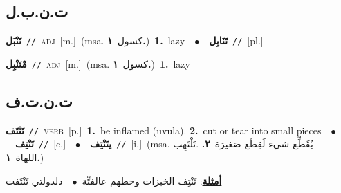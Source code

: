 \documentclass[10pt,a4paper,twoside]{article} %
\begin{document}
\begin{multicols}{2}
\vspace{-3mm}
\subsection*{\color{blue}\foreignlanguage{arabic}{ت.ن.ب.ل}\color{blue}{}} 

{\setlength\topsep{0pt}\textbf{\foreignlanguage{arabic}{تَنْبَل}}\ {\color{gray}\texttt{//}\color{black}}\ \textsc{adj}\ [m.]\ \color{gray}(msa. \foreignlanguage{arabic}{كسول}~\foreignlanguage{arabic}{\textbf{١.}})\color{black}\ \textbf{1.}~lazy\ \ $\bullet$\ \ \setlength\topsep{0pt}\textbf{\foreignlanguage{arabic}{تَنَابِل}}\ {\color{gray}\texttt{//}\color{black}}\ [pl.]\ } \vspace{2mm}

{\setlength\topsep{0pt}\textbf{\foreignlanguage{arabic}{مْتَنْبِل}}\ {\color{gray}\texttt{//}\color{black}}\ \textsc{adj}\ [m.]\ \color{gray}(msa. \foreignlanguage{arabic}{كسول}~\foreignlanguage{arabic}{\textbf{١.}})\color{black}\ \textbf{1.}~lazy\ } \vspace{2mm}

\vspace{-3mm}
\subsection*{\color{blue}\foreignlanguage{arabic}{ت.ن.ت.ف}\color{blue}{}} 

{\setlength\topsep{0pt}\textbf{\foreignlanguage{arabic}{تَنْتَف}}\ {\color{gray}\texttt{//}\color{black}}\ \textsc{verb}\ [p.]\ \textbf{1.}~be inflamed (uvula).  \textbf{2.}~cut or tear into small pieces\ \ $\bullet$\ \ \setlength\topsep{0pt}\textbf{\foreignlanguage{arabic}{تَنْتِف}}\ {\color{gray}\texttt{//}\color{black}}\ [c.]\ \ $\bullet$\ \ \setlength\topsep{0pt}\textbf{\foreignlanguage{arabic}{يتَنْتِف}}\ {\color{gray}\texttt{//}\color{black}}\ [i.]\ \color{gray}(msa. \foreignlanguage{arabic}{يُقَطِّع شيء لَقِطَع صَغيرَة}~\foreignlanguage{arabic}{\textbf{٢.}}  .\foreignlanguage{arabic}{تَلْتَهِب اللهاة}~\foreignlanguage{arabic}{\textbf{١.}})\color{black}\  \begin{flushright}\color{gray}\foreignlanguage{arabic}{\textbf{\underline{\foreignlanguage{arabic}{أمثلة}}}: تَنْتِف الخبزات وحطهم عالفتِّة\ $\bullet$\ \  دلدولتي تَنْتَفت}\end{flushright}\color{black}} \vspace{2mm}


\end{multicols}
\end{document}
